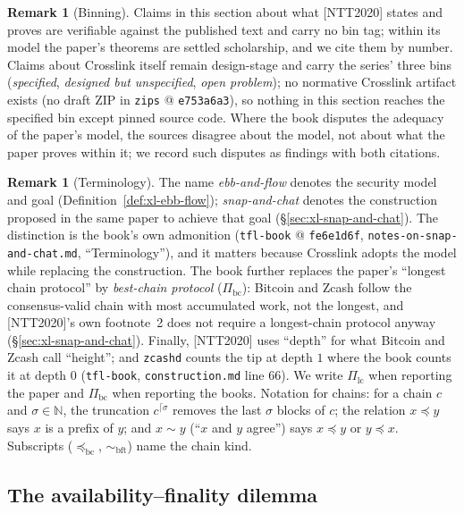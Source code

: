 \documentclass[11pt,a4paper]{article}
\theoremstyle{definition}
\newtheorem{remark}[theorem]{Remark}
\newcommand{\N}{\mathbb{N}}
\begin{document}
\begin{remark}[Binning]\label{rem:xl-model-bins}
Claims in this section about what [NTT2020] states and proves are
verifiable against the published text and carry no bin tag; within its
model the paper's theorems are settled scholarship, and we cite them by
number. Claims about Crosslink itself remain design-stage and carry the
series' three bins (\emph{specified}, \emph{designed but unspecified},
\emph{open problem}); no normative Crosslink artifact exists (no draft ZIP
in \texttt{zips} @ \texttt{e753a6a3}), so nothing in this section reaches
the specified bin except pinned source code. Where the book disputes the
adequacy of the paper's model, the sources disagree about the model, not
about what the paper proves within it; we record such disputes as findings
with both citations.
\end{remark}

\begin{remark}[Terminology]\label{rem:xl-model-terms}
The name \emph{ebb-and-flow} denotes the security model and goal
(Definition~\ref{def:xl-ebb-flow}); \emph{snap-and-chat} denotes the
construction proposed in the same paper to achieve that goal
(\S\ref{sec:xl-snap-and-chat}). The distinction is the book's own
admonition (\texttt{tfl-book} @ \texttt{fe6e1d6f},
\texttt{notes-on-\allowbreak snap-and-\allowbreak chat.md}, ``Terminology''),
and it matters
because Crosslink adopts the model while replacing the construction. The
book further replaces the paper's ``longest chain protocol'' by
\emph{best-chain protocol} ($\Pi_{\mathrm{bc}}$): Bitcoin and Zcash follow
the consensus-valid chain with most accumulated work, not the longest, and
[NTT2020]'s own footnote~2 does not require a longest-chain protocol
anyway (\S\ref{sec:xl-snap-and-chat}). Finally, [NTT2020] uses ``depth''
for what Bitcoin and Zcash call ``height''; and \texttt{zcashd} counts the
tip at depth $1$ where the book counts it at depth $0$ (\texttt{tfl-book},
\texttt{construction.md} line 66). We write $\Pi_{\mathrm{lc}}$ when
reporting the paper and $\Pi_{\mathrm{bc}}$ when reporting the books.
Notation for chains: for a chain $c$ and $\sigma \in \N$, the truncation
$c^{\lceil\sigma}$ removes the last $\sigma$ blocks of $c$; the relation
$x \preceq y$ says $x$ is a prefix of $y$; and $x \sim y$ (``$x$ and $y$
agree'') says $x \preceq y$ or $y \preceq x$. Subscripts
($\preceq_{\mathrm{bc}}$, $\sim_{\mathrm{bft}}$) name the chain kind.
\end{remark}

\subsection{The availability--finality dilemma}\label{sec:xl-dilemma}
\end{document}
